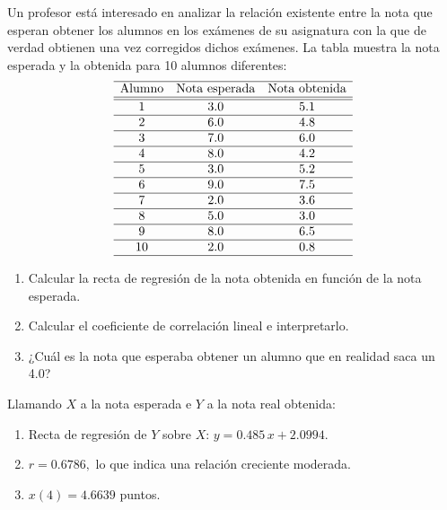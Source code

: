 {Un profesor está interesado en analizar la relación existente entre la nota que esperan obtener los alumnos en los exámenes de su
asignatura con la que de verdad obtienen una vez corregidos dichos exámenes. La tabla muestra la nota esperada y la obtenida para 10 alumnos
diferentes:
\[
\begin{array}{ccc}
\hline
\text{Alumno} & \text{Nota esperada} & \text{Nota obtenida} \\
\hline \hline
   1    &      3.0      &      5.1      \\
\hline
   2    &      6.0      &      4.8      \\
\hline
   3    &      7.0      &      6.0      \\
\hline
   4    &      8.0      &      4.2      \\
\hline
   5    &      3.0      &      5.2      \\
\hline
   6    &      9.0      &      7.5      \\
\hline
   7    &      2.0      &      3.6      \\
\hline
   8    &      5.0      &      3.0      \\
\hline
   9    &      8.0      &      6.5      \\
\hline
   10   &      2.0      &      0.8      \\
\hline
\end{array}
\]

\begin{enumerate}
\item Calcular la recta de regresión de la nota obtenida en función de la nota esperada.
\item Calcular el coeficiente de correlación lineal e interpretarlo.
\item ¿Cuál es la nota que esperaba obtener un alumno que en realidad saca un 4.0?
\end{enumerate}
}
{Llamando $X$ a la nota esperada e $Y$ a la nota real obtenida:
\begin{enumerate}
\item Recta de regresión de $Y$ sobre $X$: $y=0.485\,x+2.0994$.
\item $r=0.6786,$ lo que indica una relación creciente moderada.
\item $x(4)=4.6639$ puntos.
\end{enumerate}
}
